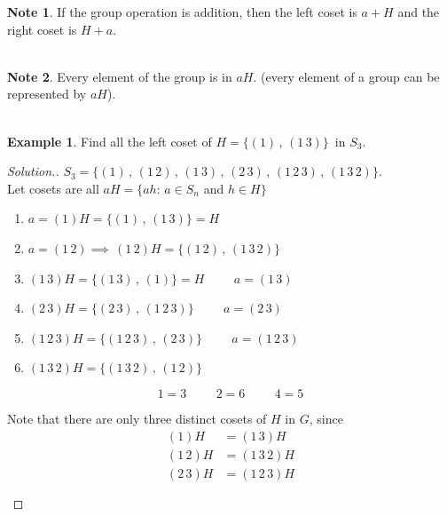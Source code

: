 \documentclass[11pt,a4paper]{article}
\theoremstyle{definition}
\newtheorem{exa}[thm]{Example}
\newtheorem*{note}{Note}
\newenvironment{solution}
  {\renewcommand{\qedsymbol}{}\begin{proof}[\textit{Solution}.]}
  {\end{proof}}
\begin{document}
\begin{note}
If the group operation is addition, then the left coset is $a + H$ and the right coset is $H + a$.\\\\
\end{note}


\begin{note}
Every element of the group is in $aH$. (every element of a group can be represented by $aH$).\\\\
\end{note}






\begin{exa}
Find all the left coset of $H = \{(1)\, , \, (1\,3)\}\,$ in $S_3$.\\
\end{exa}


\begin{solution}

$S_3 = \{(1)\, ,\, (1\,2)\, , \, (1\, 3)\,,\, (2\,3)\,,\, (1\,2\,3)\,,\,(1\,3\,2)\}$.\\

Let cosets are all $aH = \{ah:\, a\in S_n$ and $h\in H\}$
\begin{enumerate}
\item $a = (1) H = \{(1)\,,\,(1\,3)\} = H$

\item $a = (1\,2) \implies\, (1\,2)H = \{(1\,2)\, , \, (1\,3\,2)\}$

\item $(1\,3)H = \{(1\,3)\, ,\, (1)\} = H \hspace{1cm} a = (1\,3)$

\item $(2\, 3)H = \{(2\, 3)\, , \, (1\, 2\, 3)\} \hspace{1cm} a = (2\, 3)$

\item $(1\, 2\,3)H = \{(1\, 2\, 3)\, , \, (2\, 3)\}\hspace{1cm} a = (1\, 2\, 3)$

\item $(1\, 3\, 2)H = \{(1\, 3\, 2)\, ,\, (1\, 2)\}$
\end{enumerate}
$$ 1 = 3\hspace{1cm} 2 = 6\hspace{1cm} 4 = 5$$


Note that there are only three distinct cosets of $H$ in $G$,  since 
\begin{align*}
(1) H & = (1\, 3)H\\
(1\, 2)H & = (1\, 3\,2)H\\
(2\,3)H & = (1\, 2\, 3)H\\\\
\end{align*}
\end{solution}
\end{document}
